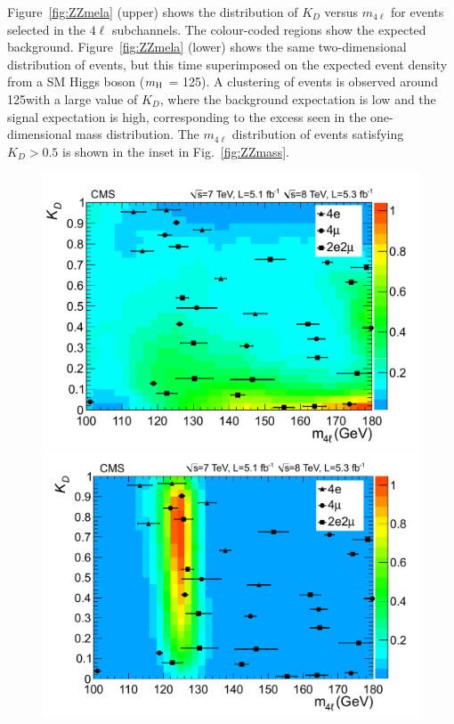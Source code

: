 \documentclass[11pt,twoside,a4paper,cmspaper,final]{cms-tdr}
\begin{document}
Figure~\ref{fig:ZZmela} (upper) shows the distribution of $K_D$ versus $m_{4\ell}$
for events selected in the $4\ell$ subchannels.
The colour-coded regions show the expected background.
Figure~\ref{fig:ZZmela} (lower) shows the same two-dimensional distribution of
events, but this time superimposed on the expected event density from
a SM Higgs boson ($m_{\mathrm{H}}$ = 125\GeV).
A clustering of events is observed around 125\GeV with a large value of $K_D$, where the background expectation is low and
the signal expectation is high, corresponding to
the excess seen in the one-dimensional mass distribution.
The $m_{4\ell}$ distribution of events satisfying $K_D > 0.5$ is shown
in the inset in Fig.~\ref{fig:ZZmass}.

\begin{figure}[htbp]
   \begin{center}
     \includegraphics[width=\cmsFigWideWidth]{mela2D_paper_background_lowmass}
     \includegraphics[width=\cmsFigWideWidth]{mela2D_paper_signal_lowmass}

\end{center}
\end{figure}
\end{document}
